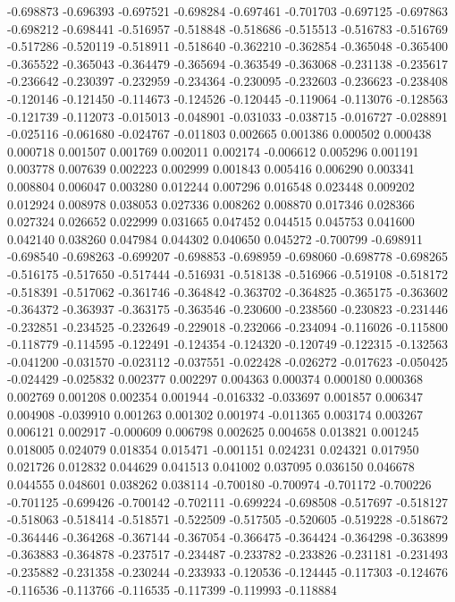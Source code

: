 -0.698873
-0.696393
-0.697521
-0.698284
-0.697461
-0.701703
-0.697125
-0.697863
-0.698212
-0.698441
-0.516957
-0.518848
-0.518686
-0.515513
-0.516783
-0.516769
-0.517286
-0.520119
-0.518911
-0.518640
-0.362210
-0.362854
-0.365048
-0.365400
-0.365522
-0.365043
-0.364479
-0.365694
-0.363549
-0.363068
-0.231138
-0.235617
-0.236642
-0.230397
-0.232959
-0.234364
-0.230095
-0.232603
-0.236623
-0.238408
-0.120146
-0.121450
-0.114673
-0.124526
-0.120445
-0.119064
-0.113076
-0.128563
-0.121739
-0.112073
-0.015013
-0.048901
-0.031033
-0.038715
-0.016727
-0.028891
-0.025116
-0.061680
-0.024767
-0.011803
0.002665
0.001386
0.000502
0.000438
0.000718
0.001507
0.001769
0.002011
0.002174
-0.006612
0.005296
0.001191
0.003778
0.007639
0.002223
0.002999
0.001843
0.005416
0.006290
0.003341
0.008804
0.006047
0.003280
0.012244
0.007296
0.016548
0.023448
0.009202
0.012924
0.008978
0.038053
0.027336
0.008262
0.008870
0.017346
0.028366
0.027324
0.026652
0.022999
0.031665
0.047452
0.044515
0.045753
0.041600
0.042140
0.038260
0.047984
0.044302
0.040650
0.045272
-0.700799
-0.698911
-0.698540
-0.698263
-0.699207
-0.698853
-0.698959
-0.698060
-0.698778
-0.698265
-0.516175
-0.517650
-0.517444
-0.516931
-0.518138
-0.516966
-0.519108
-0.518172
-0.518391
-0.517062
-0.361746
-0.364842
-0.363702
-0.364825
-0.365175
-0.363602
-0.364372
-0.363937
-0.363175
-0.363546
-0.230600
-0.238560
-0.230823
-0.231446
-0.232851
-0.234525
-0.232649
-0.229018
-0.232066
-0.234094
-0.116026
-0.115800
-0.118779
-0.114595
-0.122491
-0.124354
-0.124320
-0.120749
-0.122315
-0.132563
-0.041200
-0.031570
-0.023112
-0.037551
-0.022428
-0.026272
-0.017623
-0.050425
-0.024429
-0.025832
0.002377
0.002297
0.004363
0.000374
0.000180
0.000368
0.002769
0.001208
0.002354
0.001944
-0.016332
-0.033697
0.001857
0.006347
0.004908
-0.039910
0.001263
0.001302
0.001974
-0.011365
0.003174
0.003267
0.006121
0.002917
-0.000609
0.006798
0.002625
0.004658
0.013821
0.001245
0.018005
0.024079
0.018354
0.015471
-0.001151
0.024231
0.024321
0.017950
0.021726
0.012832
0.044629
0.041513
0.041002
0.037095
0.036150
0.046678
0.044555
0.048601
0.038262
0.038114
-0.700180
-0.700974
-0.701172
-0.700226
-0.701125
-0.699426
-0.700142
-0.702111
-0.699224
-0.698508
-0.517697
-0.518127
-0.518063
-0.518414
-0.518571
-0.522509
-0.517505
-0.520605
-0.519228
-0.518672
-0.364446
-0.364268
-0.367144
-0.367054
-0.366475
-0.364424
-0.364298
-0.363899
-0.363883
-0.364878
-0.237517
-0.234487
-0.233782
-0.233826
-0.231181
-0.231493
-0.235882
-0.231358
-0.230244
-0.233933
-0.120536
-0.124445
-0.117303
-0.124676
-0.116536
-0.113766
-0.116535
-0.117399
-0.119993
-0.118884
